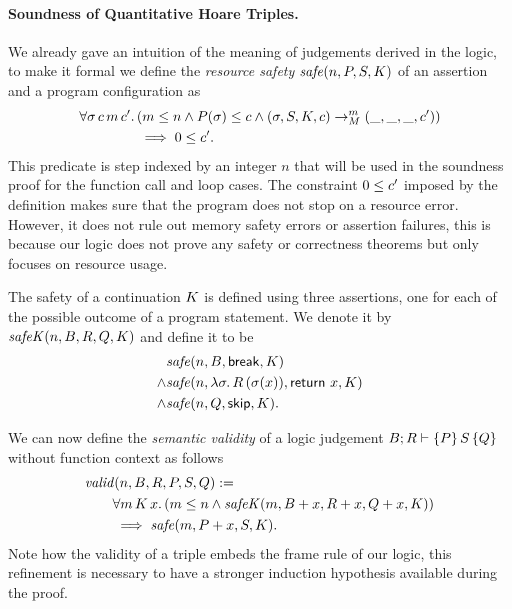 \documentclass[nocopyrightspace,preprint]{sigplanconf}
\begin{document}
\paragraph{Soundness of Quantitative Hoare Triples.}

We already gave an intuition of the meaning of judgements
derived in the logic, to make it formal we define the
\emph{resource safety} $\mathit{safe}(n,P,S,K)$ of an assertion
and a program configuration as
\begin{align*}
  \forall \sigma \, c \, m \, c' .\,&
  (m \le n \land P(\sigma) \le c \land
    (\sigma, S, K, c) \to_{M}^m (\_, \_, \_, c')) \\
  &\implies 0 \le c'.
\end{align*}
This predicate is step indexed by an integer $n$ that will
be used in the soundness proof for the function call and
loop cases.  The constraint $0 \le c'$ imposed by the
definition makes sure that the program does not stop on a
resource error.  However, it does not rule out memory safety
errors or assertion failures, this is because our logic does
not prove any safety or correctness theorems but only
focuses on resource usage.

The safety of a continuation $K$ is defined using three
assertions, one for each of the possible outcome of a program
statement.  We denote it by $\mathit{safeK}(n,B,R,Q,K)$ and define
it to be
\begin{align*}
& \mathit{safe}(n,B,\mathsf{break},K) \\
\land& \mathit{safe}(n,\lambda \sigma.\,R\,(\sigma(x)),\mathsf{return}~x,K) \\
\land& \mathit{safe}(n,Q,\mathsf{skip},K).
\end{align*}

We can now define the \emph{semantic validity} of a logic judgement
$B; R \vdash \{P\}\, S\, \{Q\}$ without function context as follows
\begin{align*}
&\mathit{valid}(n,B,R,P,S,Q) := \\
&\qquad \forall m \, K \, x .\, (m \le n \land \mathit{safeK}(m,B+x,R+x,Q+x,K)) \\
&\qquad \implies \mathit{safe}(m,P+x,S,K).
\end{align*}
Note how the validity of a triple embeds the frame rule of
our logic, this refinement is necessary to have a stronger
induction hypothesis available during the proof.
\end{document}
